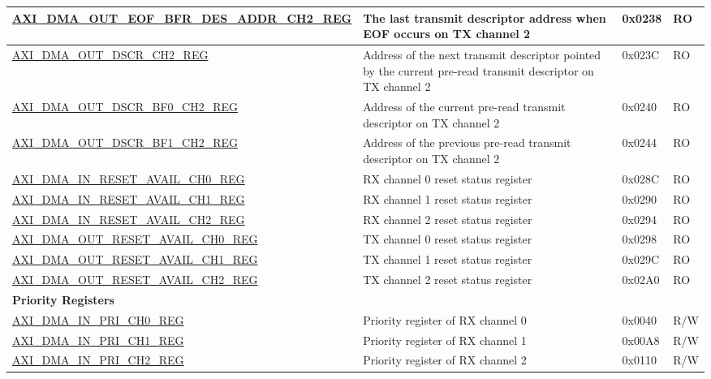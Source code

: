 \begin{longtable}{ | l | p{10cm} | p{1.3cm} | l | }
\hyperref[regdesc:AXIDMAOUTEOFBFRDESADDRCHNREG]{AXI\_DMA\_OUT\_EOF\_BFR\_DES\_ADDR\_CH2\_REG} & The last transmit descriptor address when EOF occurs on TX channel 2 & 0x0238 & RO \\ \hline
\hyperref[regdesc:AXIDMAOUTDSCRCHNREG]{AXI\_DMA\_OUT\_DSCR\_CH2\_REG} & Address of the next transmit descriptor pointed by the current pre-read transmit descriptor on TX channel 2 & 0x023C & RO \\ \hline
\hyperref[regdesc:AXIDMAOUTDSCRBF0CHNREG]{AXI\_DMA\_OUT\_DSCR\_BF0\_CH2\_REG} & Address of the current pre-read transmit descriptor on TX channel 2 & 0x0240 & RO \\ \hline
\hyperref[regdesc:AXIDMAOUTDSCRBF1CHNREG]{AXI\_DMA\_OUT\_DSCR\_BF1\_CH2\_REG} & Address of the previous pre-read transmit descriptor on TX channel 2 & 0x0244 & RO \\ \hline
\hyperref[regdesc:AXIDMAINRESETAVAILCHNREG]{AXI\_DMA\_IN\_RESET\_AVAIL\_CH0\_REG} & RX channel 0 reset status register & 0x028C & RO \\ \hline
\hyperref[regdesc:AXIDMAINRESETAVAILCHNREG]{AXI\_DMA\_IN\_RESET\_AVAIL\_CH1\_REG} & RX channel 1 reset status register & 0x0290 & RO \\ \hline
\hyperref[regdesc:AXIDMAINRESETAVAILCHNREG]{AXI\_DMA\_IN\_RESET\_AVAIL\_CH2\_REG} & RX channel 2 reset status register & 0x0294 & RO \\ \hline
\hyperref[regdesc:AXIDMAOUTRESETAVAILCHNREG]{AXI\_DMA\_OUT\_RESET\_AVAIL\_CH0\_REG} & TX channel 0 reset status register & 0x0298 & RO \\ \hline
\hyperref[regdesc:AXIDMAOUTRESETAVAILCHNREG]{AXI\_DMA\_OUT\_RESET\_AVAIL\_CH1\_REG} & TX channel 1 reset status register & 0x029C & RO \\ \hline
\hyperref[regdesc:AXIDMAOUTRESETAVAILCHNREG]{AXI\_DMA\_OUT\_RESET\_AVAIL\_CH2\_REG} & TX channel 2 reset status register & 0x02A0 & RO \\ \hline
\multicolumn{4}{|l|}{\textbf{Priority Registers}} \\ \hline
\hyperref[regdesc:AXIDMAINPRICHNREG]{AXI\_DMA\_IN\_PRI\_CH0\_REG} & Priority register of RX channel 0 & 0x0040 & R/W \\ \hline
\hyperref[regdesc:AXIDMAINPRICHNREG]{AXI\_DMA\_IN\_PRI\_CH1\_REG} & Priority register of RX channel 1 & 0x00A8 & R/W \\ \hline
\hyperref[regdesc:AXIDMAINPRICHNREG]{AXI\_DMA\_IN\_PRI\_CH2\_REG} & Priority register of RX channel 2 & 0x0110 & R/W \\ \hline

\end{longtable}
